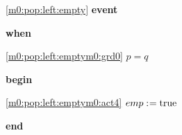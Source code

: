 \noindent \ref{m0:pop:left:empty}  \textbf{event}
\begin{block}
  \item   \textbf{when}
  \begin{block}
  \item[ \eqref{m0:pop:left:emptym0:grd0} ]$p = q $ %
  \end{block}
  \item   \textbf{begin}
  \begin{block}
  \item[ \eqref{m0:pop:left:emptym0:act4} ]$emp \mathrel{:\mkern1mu=} \text{true} $ %
  \end{block}
  \item   \textbf{end} \\
\end{block}
